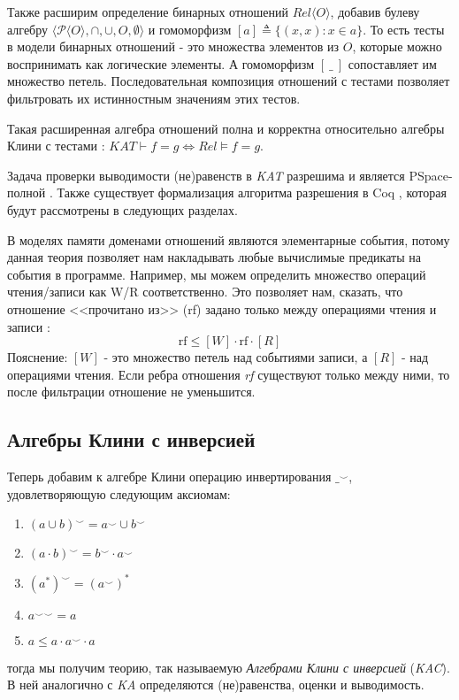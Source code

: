 \documentclass[times
              ,specification
              ,annotation
              ]{itmo-student-thesis}
\begin{document}
      Также расширим определение бинарных отношений $Rel \langle O \rangle $, добавив булеву алгебру $\langle
      \mathcal{P}\langle O \rangle, \cap, \cup, O, \emptyset \rangle$ и гомоморфизм $ [a] \triangleq \{(x, x): x \in a\} $.
      То есть тесты в модели бинарных отношений - это множества элементов из $O$, которые можно
      воспринимать как логические элементы. А гомоморфизм $[\:\_\:]$ сопоставляет им множество петель.
      Последовательная композиция отношений с тестами позволяет фильтровать их истинностным значениям
      этих тестов.

      Такая расширенная алгебра отношений полна и корректна относительно алгебры Клини с тестами
      \cite{kat_completeness}: $\mathit{KAT} \vdash f = g \Leftrightarrow \mathit{Rel} \models f = g$.
      
      Задача проверки выводимости (не)равенств в \textit{KAT} разрешима и является PSpace-полной
      \cite{kat_complexity}. Также существует формализация алгоритма разрешения в Coq \cite{kat},
      которая будут рассмотрены в следующих разделах.

      В моделях памяти доменами отношений являются элементарные события, потому данная теория позволяет
      нам накладывать любые вычислимые предикаты на события в программе. Например, мы можем определить
      множество операций чтения/записи как W/R соответственно.
      Это позволяет нам, сказать, что отношение <<прочитано из>> (rf) задано только между
      операциями чтения и записи \cite{rc11}:
      $$ \text{rf} \leq [W] \cdot \text{rf} \cdot [R] $$
      Пояснение: $ [W] $ - это множество петель над событиями записи, а $[R]$ - над операциями чтения.
      Если ребра отношения \textit{rf} существуют только между ними, то после фильтрации отношение не
      уменьшится. 


    \subsection{Алгебры Клини с инверсией}
      Теперь добавим к алгебре Клини операцию инвертирования $ \_^{\smile} $, удовлетворяющую следующим аксиомам:
      \begin{enumerate}
        \item $ (a \cup b)^{\smile} = a^{\smile} \cup b^{\smile} $
        \item $ (a \cdot b)^{\smile} = b^{\smile} \cdot a^{\smile} $
        \item $ (a^*)^{\smile} = (a^{\smile})^* $
        \item $ {a^{\smile}}^{\smile} = a $
        \item $ a \leq a \cdot a^{\smile} \cdot a $
      \end{enumerate}
      тогда мы получим теорию, так называемую \textit{Алгебрами Клини с инверсией} (\textit{KAC}).
      В ней аналогично с \textit{KA} определяются (не)равенства, оценки и выводимость.
\end{document}
